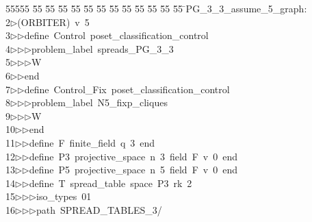 %
%
\begin{tabbing}
55555 \= 55 \= 55 \= 55 \= 55 \= 55 \= 55 \= 55 \= 55 \= 55 \= 55 \= 55 \= 55 \= \>PG\_3\_3\_assume\_5\_graph:\\[0pt]
2\>$\triangleright$\>(ORBITER)\ v\ 5\ \\[0pt]
3\>$\triangleright$\>$\triangleright$\>define\ Control\ poset\_classification\_control\ \\[0pt]
4\>$\triangleright$\>$\triangleright$\>$\triangleright$\>problem\_label\ spreads\_PG\_3\_3\ \\[0pt]
5\>$\triangleright$\>$\triangleright$\>$\triangleright$\>W\ \\[0pt]
6\>$\triangleright$\>$\triangleright$\>end\ \\[0pt]
7\>$\triangleright$\>$\triangleright$\>define\ Control\_Fix\ poset\_classification\_control\ \\[0pt]
8\>$\triangleright$\>$\triangleright$\>$\triangleright$\>problem\_label\ N5\_fixp\_cliques\ \\[0pt]
9\>$\triangleright$\>$\triangleright$\>$\triangleright$\>W\ \\[0pt]
10\>$\triangleright$\>$\triangleright$\>end\ \\[0pt]
11\>$\triangleright$\>$\triangleright$\>define\ F\ finite\_field\ q\ 3\ end\ \\[0pt]
12\>$\triangleright$\>$\triangleright$\>define\ P3\ projective\_space\ n\ 3\ field\ F\ v\ 0\ end\ \\[0pt]
13\>$\triangleright$\>$\triangleright$\>define\ P5\ projective\_space\ n\ 5\ field\ F\ v\ 0\ end\ \\[0pt]
14\>$\triangleright$\>$\triangleright$\>define\ T\ spread\_table\ space\ P3\ rk\ 2\ \\[0pt]
15\>$\triangleright$\>$\triangleright$\>$\triangleright$\>iso\_types\ 01\ \\[0pt]
16\>$\triangleright$\>$\triangleright$\>$\triangleright$\>path\ SPREAD\_TABLES\_3/\ \\[0pt]

\end{tabbing}
